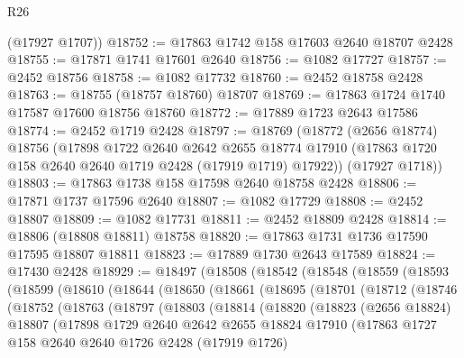 \begin{lexlean}{R26}
\begin{coremodule}
      (@17927 @1707))
@18752 := @17863 @1742 @158 @17603 @2640 @18707 @2428
@18755 := @17871 @1741 @17601 @2640
@18756 := @1082 @17727
@18757 := @2452 @18756
@18758 := @1082 @17732
@18760 := @2452 @18758 @2428
@18763 := @18755 (@18757 @18760) @18707
@18769 := @17863 @1724 @1740 @17587 @17600 @18756 @18760
@18772 := @17889 @1723 @2643 @17586
@18774 := @2452 @1719 @2428
@18797 := @18769
    (@18772
      (@2656 @18774)
      @18756
      (@17898
        @1722
        @2640
        @2642
        @2655
        @18774
        @17910
        (@17863 @1720 @158 @2640 @2640 @1719 @2428 (@17919 @1719) @17922))
      (@17927 @1718))
@18803 := @17863 @1738 @158 @17598 @2640 @18758 @2428
@18806 := @17871 @1737 @17596 @2640
@18807 := @1082 @17729
@18808 := @2452 @18807
@18809 := @1082 @17731
@18811 := @2452 @18809 @2428
@18814 := @18806 (@18808 @18811) @18758
@18820 := @17863 @1731 @1736 @17590 @17595 @18807 @18811
@18823 := @17889 @1730 @2643 @17589
@18824 := @17430 @2428
@18929 := @18497
    (@18508
      (@18542
        (@18548
          (@18559
            (@18593
              (@18599
                (@18610
                  (@18644
                    (@18650
                      (@18661
                        (@18695
                          (@18701
                            (@18712
                              (@18746
                                (@18752
                                  (@18763
                                    (@18797
                                      (@18803
                                        (@18814
                                          (@18820
                                            (@18823
                                              (@2656 @18824)
                                              @18807
                                              (@17898
                                                @1729
                                                @2640
                                                @2642
                                                @2655
                                                @18824
                                                @17910
                                                (@17863
                                                  @1727
                                                  @158
                                                  @2640
                                                  @2640
                                                  @1726
                                                  @2428
                                                  (@17919 @1726)

\end{coremodule}
\end{lexlean}
